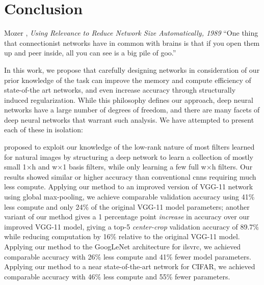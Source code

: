 \documentclass[thesis]{subfiles}
\begin{document}

\chapter{Conclusion}
\label{conclusion}
\begin{chapquote}{Mozer \etal, \textit{Using Relevance to Reduce Network Size Automatically, 1989}}
    ``One thing that connectionist networks have in common with brains is that if you open them up and peer inside, all you can see is a big pile of goo.''
\end{chapquote}
In this work, we propose that carefully designing networks in consideration of our prior knowledge of the task can improve the memory and compute efficiency of state-of-the art networks, and even increase accuracy through structurally induced regularization. While this philosophy defines our approach, deep neural networks have a large number of degrees of freedom, and there are many facets of deep neural networks that warrant such analysis. We have attempted to present each of these in isolation:

 proposed to exploit our knowledge of the low-rank nature of most filters learned for natural images by structuring a deep network to learn a collection of mostly small 1$\times$h and w$\times$1 basis filters, while only learning a few full w$\times$h filters. Our results showed similar or higher accuracy than conventional \glspl{cnn} requiring much less compute. Applying our method to an improved version of VGG-11 network using global max-pooling, we achieve comparable validation accuracy using 41\% less compute and only 24\% of the original VGG-11 model parameters; another variant of our method gives a 1 percentage point {\em increase} in accuracy over our improved VGG-11 model, giving a top-5 \emph{center-crop} validation accuracy of 89.7\% while reducing computation by 16\% relative to the original VGG-11 model. Applying our method to the GoogLeNet architecture for \gls{ilsvrc}, we achieved comparable accuracy with 26\% less compute and 41\% fewer model parameters. Applying our method to a near state-of-the-art network for CIFAR, we achieved comparable accuracy with 46\% less compute and 55\% fewer parameters. 
	
\end{document}
